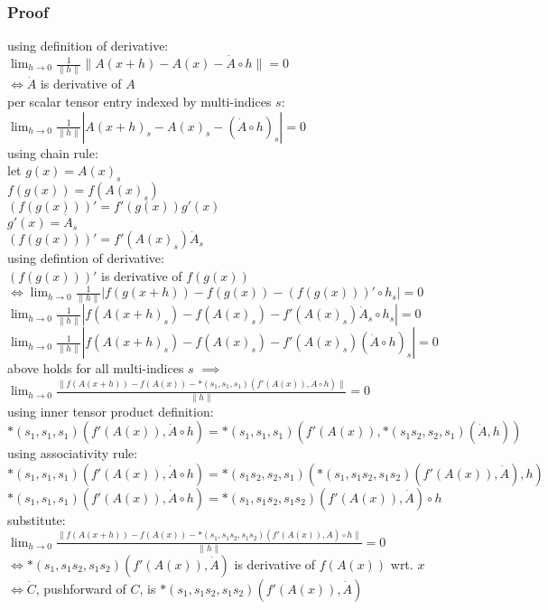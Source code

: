 \documentclass[8pt]{extarticle}
\begin{document}
\begin{multicols*}{2}
  \subsubsection{Proof}
  using definition of derivative:\\
  $\lim_{h\rightarrow 0} \frac{1}{\|h\|} \|A(x+h)-A(x)-\dot{A} \circ h\| = 0$\\
  $\iff \dot{A}$ is derivative of $A$\\
  per scalar tensor entry indexed by multi-indices $s$:\\
  $\lim_{h\rightarrow0} \frac{1}{\|h\|} |A(x+h)_s - A(x)_s - (\dot{A} \circ h)_s | =0$\\
  using chain rule:\\
  let $g(x) = A(x)_s$\\
  $f(g(x))=f(A(x)_s)$\\
  $(f(g(x)))' = f'(g(x)) g'(x)$\\
  $g'(x) = \dot{A}_s$\\
  $(f(g(x)))' = f'(A(x)_s) \dot{A}_s$\\
  using defintion of derivative:\\
  $(f(g(x)))'$ is derivative of $f(g(x))$\\
  $\iff \lim_{h\rightarrow 0} \frac{1}{\| h \|} | f(g(x+h)) - f(g(x)) - (f(g(x)))' \circ h_s | = 0$\\
  $\lim_{h\rightarrow 0} \frac{1}{\| h \|} | f(A(x+h)_s) - f(A(x)_s) - f'(A(x)_s) \dot{A}_s \circ h_s | = 0$\\
  $\lim_{h\rightarrow 0} \frac{1}{\| h \|} | f(A(x+h)_s) - f(A(x)_s) - f'(A(x)_s) (\dot{A} \circ h)_s | = 0$\\
  above holds for all multi-indices $s$ $\implies$\\
  $\lim_{h\rightarrow 0} \frac{\| f(A(x+h)) - f(A(x)) - *(s_1, s_1, s_1)(f'(A(x)), \dot{A} \circ h) \|}{\| h \|} = 0$\\
  using inner tensor product definition:\\
  $*(s_1,s_1,s_1)(f'(A(x)), \dot{A} \circ h) = *(s_1,s_1,s_1)(f'(A(x)), *(s_1 s_2, s_2, s_1)(\dot{A}, h))$\\
  using associativity rule:\\
  $*(s_1,s_1,s_1)(f'(A(x)), \dot{A} \circ h) = *(s_1 s_2, s_2, s_1)(*(s_1, s_1 s_2, s_1 s_2)(f'(A(x)), \dot{A}), h)$\\
  $*(s_1,s_1,s_1)(f'(A(x)), \dot{A} \circ h) = *(s_1, s_1 s_2, s_1 s_2)(f'(A(x)), \dot{A}) \circ h$\\
  substitute:\\
  $\lim_{h\rightarrow 0} \frac{\| f(A(x+h)) - f(A(x)) - *(s_1, s_1 s_2, s_1 s_2)(f'(A(x)), \dot{A}) \circ h \|}{\| h \|} = 0$\\
  $\iff *(s_1, s_1 s_2, s_1 s_2)(f'(A(x)), \dot{A})$ is derivative of $f(A(x))$ wrt. $x$\\
  $\iff \dot{C}$, pushforward of $C$, is $*(s_1, s_1 s_2, s_1 s_2)(f'(A(x)), \dot{A})$


\end{multicols*}
\end{document}

